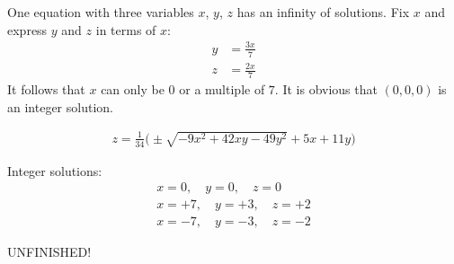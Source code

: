 One equation with three variables $x$, $y$, $z$ has an infinity of solutions. Fix $x$ and express $y$ and $z$ in terms of $x$:
\begin{align*}
y & = \frac{3x}{7} 
\\
z & = \frac{2x}{7} 
\end{align*}
It follows that $x$ can only be $0$ or a multiple of $7$. It is obvious that $(0,0,0)$ is an integer solution. 

\begin{align*}
z = \frac{1}{34}  \bigl( \pm \sqrt{-9x^{2} + 42xy - 49y^{2}} + 5x + 11y \bigr)
\end{align*}


Integer solutions:
\begin{align*}
x = 0, 
\quad
y = 0,
\quad 
z = 0
\\
x = +7, 
\quad
y = +3,
\quad 
z = +2
\\
x = -7, 
\quad
y = -3,
\quad 
z = -2
\end{align*}

UNFINISHED!
